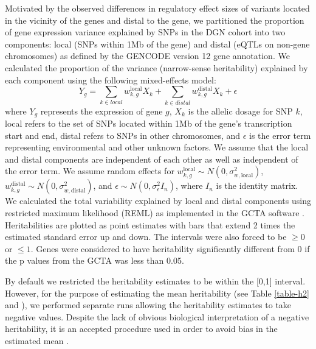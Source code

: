 \documentclass[10pt,letterpaper]{article}
\begin{document}
Motivated by the observed differences in regulatory effect sizes of variants located in the vicinity of the genes and distal to the gene,
we partitioned the proportion of gene expression variance explained by
SNPs in the DGN cohort into two components: local (SNPs within 1Mb of
the gene) and distal (eQTLs on non-gene chromosomes) as defined by the
GENCODE \cite{Harrow_2012} version 12 gene annotation. We calculated the
proportion of the variance (narrow-sense heritability) explained by each
component using the following mixed-effects model:
%
\[ Y_g = \sum_{k  \in local}w^\text{local}_{k,g} X_k + \sum_{k  \in distal}w^\text{distal}_{k,g} X_k + \epsilon \]
%
where $Y_g$ represents the expression of gene $g$, $X_k$ is the allelic dosage for SNP $k$, local refers to the set of SNPs located within 1Mb of the gene's transcription start and end, distal refers to SNPs in other chromosomes, and $\epsilon$ is the error term representing environmental and other unknown factors. We assume that the local and distal components are independent of each other as well as independent of the error term.
We assume random effects for \(w^\text{local}_{k,g} \sim N(0, \sigma^2_{w,\text{local}})\), \(w^\text{distal}_{k,g} \sim N(0, \sigma^2_{w,\text{distal}})\), and
\(\epsilon \sim N(0, \sigma^2_{\epsilon} I_n)\), where \(I_n\) is the
identity matrix. We calculated the total variability explained by local
and distal components using restricted
maximum likelihood (REML) as implemented in the GCTA software \cite{Yang_2011}. 
Heritabilities are plotted as point estimates with bars that extend 2 times the estimated standard error up and down. The intervals were also forced to be $\ge 0 $ or $\le 1$. 
Genes were considered to have heritability significantly different from 0 if the p values from the GCTA was less than 0.05.

By default we restricted the heritability estimates to be within the [0,1] interval. However, 
for the purpose of estimating the mean heritability (see Table \ref{table-h2} and ), we performed separate runs allowing the heritability estimates to 
take negative values. Despite the lack of obvious biological interpretation of a negative heritability, 
it is an accepted procedure used in order to avoid bias in the estimated mean \cite{Price_2011,Wright_2014}.
\end{document}
